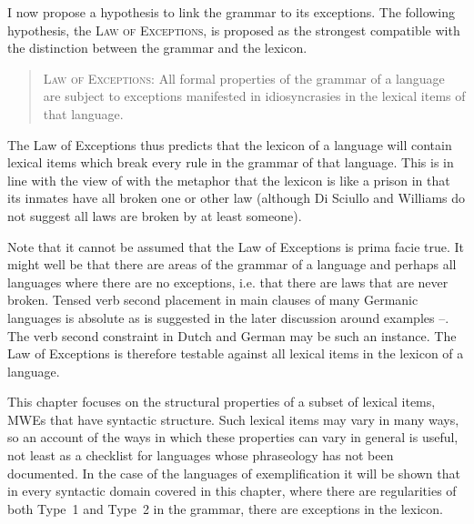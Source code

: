 \documentclass[output=paper]{langsci/langscibook}
\begin{document}
I now propose a hypothesis to link the grammar to its exceptions. The following hypothesis,  the 
\textsc{Law of Exceptions}, is proposed as the strongest compatible with the distinction between 
the grammar and the lexicon.

\begin{quote}
\textsc{Law of Exceptions:} All formal properties of the grammar of a language are subject to exceptions manifested in idiosyncrasies in the lexical items of that language.
\end{quote}

The Law of Exceptions thus predicts that the lexicon of a language will 
contain lexical items which break every rule in the grammar of that 
language. This is in line with the view of \citet{DiSciullo1987} with the 
metaphor that the lexicon is like a prison in that its inmates have all 
broken one or other law (although Di Sciullo and Williams do not suggest 
all laws are broken by at least someone). 

Note that it cannot be assumed that the Law of Exceptions is prima facie 
true. It might well be that there are areas of the grammar of a language 
and perhaps all languages where there are no exceptions, i.e. that there 
are laws that are never broken.  Tensed verb second placement in main 
clauses of many Germanic languages is absolute as is suggested in the 
later discussion around examples --. The verb 
second constraint in Dutch and German may be such an instance. 
 
The Law of Exceptions is therefore testable against all lexical items in the lexicon 
of a language. 

This chapter focuses on the structural properties of a subset of lexical items, MWEs that have syntactic structure. Such lexical items may vary in many ways, so an account of the ways in which these properties can vary in general is useful, not least as a checklist for languages whose phraseology has not been documented. In the case of the languages of exemplification it will be shown that in every syntactic domain covered in this chapter, where there are regularities of both Type~1 and Type~2 in the grammar, there are exceptions in the lexicon.
\end{document}
